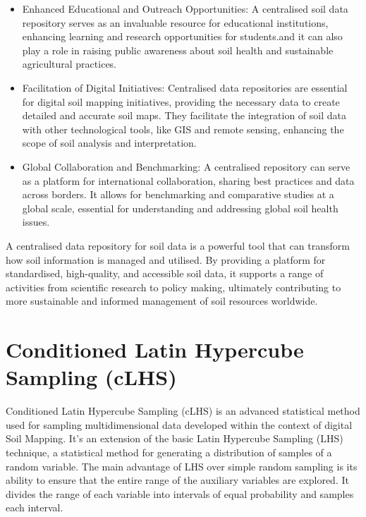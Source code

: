 \documentclass[
]{book}
\begin{document}
\begin{itemize}
\item
  Enhanced Educational and Outreach Opportunities: A centralised soil data repository serves as an invaluable resource for educational institutions, enhancing learning and research opportunities for students.and it can also play a role in raising public awareness about soil health and sustainable agricultural practices.
\item
  Facilitation of Digital Initiatives: Centralised data repositories are essential for digital soil mapping initiatives, providing the necessary data to create detailed and accurate soil maps. They facilitate the integration of soil data with other technological tools, like GIS and remote sensing, enhancing the scope of soil analysis and interpretation.
\item
  Global Collaboration and Benchmarking: A centralised repository can serve as a platform for international collaboration, sharing best practices and data across borders. It allows for benchmarking and comparative studies at a global scale, essential for understanding and addressing global soil health issues.
\end{itemize}

A centralised data repository for soil data is a powerful tool that can transform how soil information is managed and utilised. By providing a platform for standardised, high-quality, and accessible soil data, it supports a range of activities from scientific research to policy making, ultimately contributing to more sustainable and informed management of soil resources worldwide.

\hypertarget{conditioned-latin-hypercube-sampling-clhs}{%
\section*{Conditioned Latin Hypercube Sampling (cLHS)}\label{conditioned-latin-hypercube-sampling-clhs}}

Conditioned Latin Hypercube Sampling (cLHS) is an advanced statistical method used for sampling multidimensional data developed within the context of digital Soil Mapping. It's an extension of the basic Latin Hypercube Sampling (LHS) technique, a statistical method for generating a distribution of samples of a random variable. The main advantage of LHS over simple random sampling is its ability to ensure that the entire range of the auxiliary variables are explored. It divides the range of each variable into intervals of equal probability and samples each interval.
\end{document}
